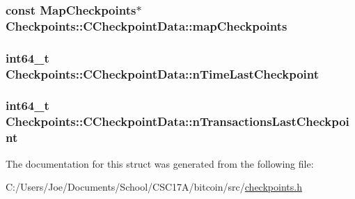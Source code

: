 \subsubsection[{map\+Checkpoints}]{\setlength{\rightskip}{0pt plus 5cm}const {\bf Map\+Checkpoints}$\ast$ Checkpoints\+::\+C\+Checkpoint\+Data\+::map\+Checkpoints}\label{struct_checkpoints_1_1_c_checkpoint_data_ab4aa42cde482f7cf7ab015abbf7108cb}
\hypertarget{struct_checkpoints_1_1_c_checkpoint_data_a49124425a3f9ccddba8bce3dd67ad3b3}{}
\subsubsection[{n\+Time\+Last\+Checkpoint}]{\setlength{\rightskip}{0pt plus 5cm}int64\+\_\+t Checkpoints\+::\+C\+Checkpoint\+Data\+::n\+Time\+Last\+Checkpoint}\label{struct_checkpoints_1_1_c_checkpoint_data_a49124425a3f9ccddba8bce3dd67ad3b3}
\hypertarget{struct_checkpoints_1_1_c_checkpoint_data_ad659d70f627b0c4529fc0e71f568de70}{}
\subsubsection[{n\+Transactions\+Last\+Checkpoint}]{\setlength{\rightskip}{0pt plus 5cm}int64\+\_\+t Checkpoints\+::\+C\+Checkpoint\+Data\+::n\+Transactions\+Last\+Checkpoint}\label{struct_checkpoints_1_1_c_checkpoint_data_ad659d70f627b0c4529fc0e71f568de70}


The documentation for this struct was generated from the following file\+:\begin{DoxyCompactItemize}
\item 
C\+:/\+Users/\+Joe/\+Documents/\+School/\+C\+S\+C17\+A/bitcoin/src/\hyperlink{checkpoints_8h}{checkpoints.\+h}\end{DoxyCompactItemize}
